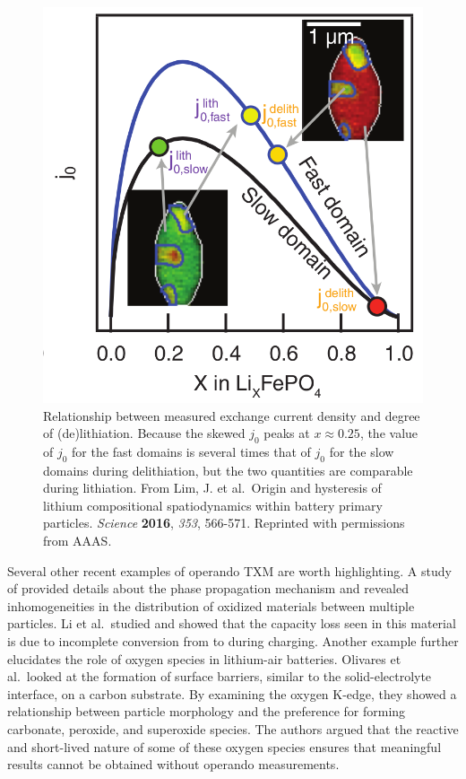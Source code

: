 \documentclass[journal=cmatex,manuscript=perspective]{achemso}
\begin{document}
\begin{figure}
  \includegraphics[width=\textwidth]{lim2016.png}
  \caption{Relationship between measured exchange current density and
    degree of (de)lithiation. Because the skewed $j_0$ peaks at $x
    \approx 0.25$, the value of $j_0$ for the fast domains is several
    times that of $j_0$ for the slow domains during delithiation, but
    the two quantities are comparable during lithiation. From Lim,
    J. et al.\ Origin and hysteresis of lithium compositional
    spatiodynamics within battery primary particles. \textit{Science}
    \textbf{2016}, \textit{353}, 566-571. Reprinted with permissions
    from AAAS.}
  \label{figure:lim2016}
\end{figure}

Several other recent examples of operando TXM are worth
highlighting. A study of  provided details about the phase
propagation mechanism and revealed inhomogeneities in the distribution
of oxidized materials between multiple particles\cite{wang2014}. Li et
al.\ studied  and showed that the capacity loss seen in this
material is due to incomplete conversion from  to 
during charging\cite{jin2015}. Another example further elucidates the
role of oxygen species in lithium-air batteries. Olivares et
al.\ looked at the formation of surface barriers, similar to the
solid-electrolyte interface, on a carbon substrate. By examining the
oxygen K-edge, they showed a relationship between particle morphology
and the preference for forming carbonate, peroxide, and superoxide
species\cite{olivares2015}. The authors argued that the reactive and
short-lived nature of some of these oxygen species ensures that
meaningful results cannot be obtained without operando measurements.
\end{document}
